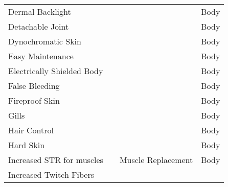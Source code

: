 \documentclass[twoside]{book}
\begin{document}
\begin{longtable}{p{1.25in}p{2em}ll}
  \raggedright
           Dermal Backlight 
  &
  
  &
  
  &
   Body 
  \tabularnewline
      
  \raggedright
           Detachable Joint 
  &
  
  &
  
  &
   Body 
  \tabularnewline
      
  \raggedright
           Dynochromatic Skin 
  &
  
  &
  
  &
   Body 
  \tabularnewline
      
  \raggedright
           Easy Maintenance 
  &
  
  &
  
  &
   Body 
  \tabularnewline
      
  \raggedright
           Electrically Shielded Body
           
  &
  
  &
  
  &
   Body 
  \tabularnewline
      
  \raggedright
           False Bleeding 
  &
  
  &
  
  &
   Body 
  \tabularnewline
      
  \raggedright
           Fireproof Skin 
  &
  
  &
  
  &
   Body 
  \tabularnewline
      
  \raggedright
           Gills 
  &
  
  &
  
  &
   Body 
  \tabularnewline
      
  \raggedright
           Hair Control 
  &
  
  &
  
  &
   Body 
  \tabularnewline
      
  \raggedright
           Hard Skin 
  &
  
  &
  
  &
   Body 
  \tabularnewline
      
  \raggedright
           Increased STR for muscles
           
  &
  
  &
   Muscle Replacement
           
  &
   Body 
  \tabularnewline
      
  \raggedright
           Increased Twitch Fibers
           

\end{longtable}
\end{document}
